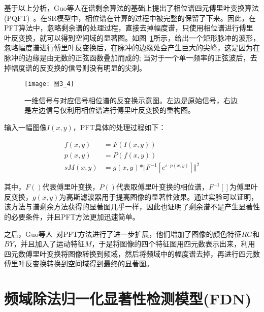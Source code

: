 基于以上分析，Guo等人在谱剩余算法的基础上提出了相位谱四元傅里叶变换算法(PQFT)~\cite{GuoChenleiCVPR2008Spatio}。在SR模型中，相位谱在计算的过程中被完整的保留了下来。因此，在PFT算法中，忽略剩余谱的处理过程，直接去掉幅度谱，只使用相位谱进行傅里叶反变换，就可以得到空间域的显著图。如图~\ref{图3_4}所示，给出一个矩形脉冲的波形，忽略幅度谱进行傅里叶反变换后，在脉冲的边缘处会产生巨大的尖峰，这是因为在脉冲的边缘是由无数的正弦函数叠加而成的; 当对于一个单一频率的正弦波后，去掉幅度谱的反变换的信号则没有明显的尖刺。
\begin{figure}[!t] %
\centering
\texttt{[image: 图3\_4]}
\caption{一维信号与对应信号相位谱的反变换示意图。左边是原始信号，右边是左边信号仅利用相位谱进行傅里叶反变换的重构图。}
\label{图3_4}
\end{figure}

输入一幅图像$I(x,y)$，PFT具体的处理过程如下：
\begin{linenomath}
\begin{align}
f(x,y) &= F(I(x,y))\label{式3_11}\\
p(x,y) &= P(f(x,y))\label{式3_12}\\
sM(x,y) &= g(x,y)\ast\Vert F^{-1}[e^{i\cdot p(x,y)}]\Vert^{2}\label{式3_13}
\end{align}
\end{linenomath}
其中，$F()$代表傅里叶变换，$P()$代表取傅里叶变换的相位谱，$F^{-1}[]$为傅里叶反变换，$g(x,y)$为高斯滤波器用于提高图像的显著性效果。通过实验可以证明，该方法与谱剩余方法获得的显著图几乎一样，因此也证明了剩余谱不是产生显著性的必要条件，并且PFT方法更加迅速简单。

之后，Guo等人~\cite{GuoChenleiCVPR2008Spatio}对PFT方法进行了进一步扩展，他们增加了图像的颜色特征$RG$和$BY$，并且加入了运动特征$M$，于是将图像的四个特征图用四元数表示出来，利用四元数傅里叶变换将图像转换到频域，然后将频域中的幅度谱去掉，再进行四元数傅里叶反变换转换到空间域得到最终的显著图。

\section{频域除法归一化显著性检测模型(FDN)}
\label{3_3}

